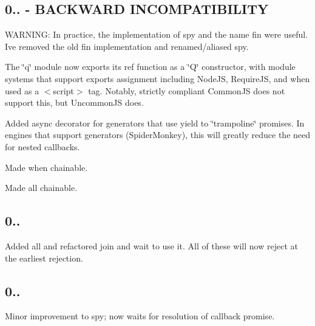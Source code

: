 \subsection*{0.. -\/ B\+A\+C\+K\+W\+A\+RD I\+N\+C\+O\+M\+P\+A\+T\+I\+B\+I\+L\+I\+TY}


\begin{DoxyItemize}
\item W\+A\+R\+N\+I\+NG\+: In practice, the implementation of {\ttfamily spy} and the name {\ttfamily fin} were useful. I\textquotesingle{}ve removed the old {\ttfamily fin} implementation and renamed/aliased {\ttfamily spy}.
\item The \char`\"{}q\char`\"{} module now exports its {\ttfamily ref} function as a \char`\"{}\+Q\char`\"{} constructor, with module systems that support exports assignment including Node\+JS, Require\+JS, and when used as a {\ttfamily $<$script$>$} tag. Notably, strictly compliant Common\+JS does not support this, but Uncommon\+JS does.
\item Added {\ttfamily async} decorator for generators that use yield to \char`\"{}trampoline\char`\"{} promises. In engines that support generators (Spider\+Monkey), this will greatly reduce the need for nested callbacks.
\item Made {\ttfamily when} chainable.
\item Made {\ttfamily all} chainable.
\end{DoxyItemize}

\subsection*{0..}


\begin{DoxyItemize}
\item Added {\ttfamily all} and refactored {\ttfamily join} and {\ttfamily wait} to use it. All of these will now reject at the earliest rejection.
\end{DoxyItemize}

\subsection*{0..}


\begin{DoxyItemize}
\item Minor improvement to {\ttfamily spy}; now waits for resolution of callback promise.
\end{DoxyItemize}

